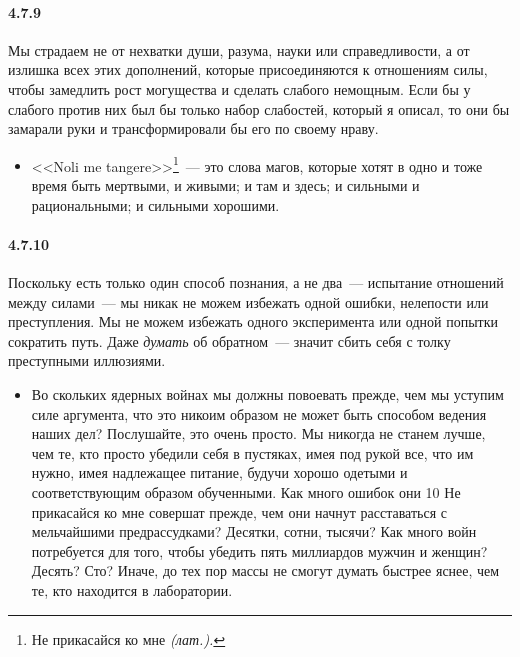 \paragraph{4.7.9}\hypertarget{par:4.7.9}{} Мы страдаем не от нехватки души, разума, науки или справедливости, а от излишка всех этих дополнений, которые присоединяются к отношениям силы, чтобы замедлить рост могущества и сделать слабого немощным. Если бы у слабого против них был бы только набор слабостей, который я описал, то они бы замарали руки и трансформировали бы его по своему нраву. 
	\begin{itemize}
	\item 
	<<Noli me tangere>>\footnote{Не прикасайся ко мне {\itshape(лат.).}}~--- это слова магов, которые хотят в одно и тоже время быть мертвыми, и живыми; и там и здесь; и сильными и рациональными; и сильными хорошими.
	\end{itemize}	

\paragraph{4.7.10}\hypertarget{par:4.7.10}{}Поскольку есть только один способ познания, а не два~--- испытание отношений между силами~--- мы никак не можем избежать одной ошибки, нелепости или преступления. Мы не можем избежать одного эксперимента или одной попытки сократить путь. Даже {\itshape думать} об обратном~--- значит сбить себя с толку преступными иллюзиями. 
	\begin{itemize}
	\item 
	Во скольких ядерных войнах мы должны повоевать прежде, чем мы уступим силе аргумента, что это никоим образом не может быть способом ведения наших дел? Послушайте, это очень просто. Мы никогда не станем лучше, чем те, кто просто убедили себя в пустяках, имея под рукой все, что им нужно, имея надлежащее питание, будучи хорошо одетыми и соответствующим образом обученными. Как много ошибок они 10 Не прикасайся ко мне  совершат прежде, чем они начнут расставаться с мельчайшими предрассудками? Десятки, сотни, тысячи? Как много войн потребуется для того, чтобы убедить пять миллиардов мужчин и женщин? Десять? Сто? Иначе, до тех пор массы не смогут думать быстрее яснее, чем те, кто находится в лаборатории.
	\end{itemize}	

